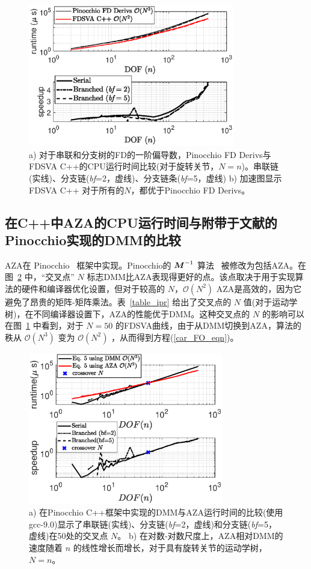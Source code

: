 \documentclass[letterpaper, 10 pt, conference]{ieeetran}  %
\begin{document}
\begin{figure}[tb]
\hspace*{-0.5cm}
\includegraphics[width=9cm]{fdcr_vs_fdsva_wo_march_gcc.eps}
\caption{a) 对于串联和分支树的FD的一阶偏导数，Pinocchio FD Derivs与FDSVA C++的CPU运行时间比较(对于旋转关节，$N=n$)。串联链(实线)、分支链(\textit{bf}=2，虚线)、分支链条(\textit{bf}=5，虚线) b) 加速图显示FDSVA C++ 对于所有的$N$，都优于Pinocchio FD Derivs。}
\label{fdsva_fdcr_pin}
\end{figure}

\subsection{在C++中AZA的CPU运行时间与附带于文献\cite{car}的Pinocchio实现的DMM的比较}
AZA在 Pinocchio~\cite{car_code} 框架中实现。Pinocchio的 $\boldsymbol{M}^{-1}$ 算法~\cite{InverseMassMatrix} 被修改为包括AZA。在图~\ref{dmm_vs_aza} 中，“交叉点” $N$ 标志DMM比AZA表现得更好的点。该点取决于用于实现算法的硬件和编译器优化设置，但对于较高的 $N$，$\mathcal{O}(N^2)$ AZA是高效的，因为它避免了昂贵的矩阵-矩阵乘法。表~\ref{table_ipr} 给出了交叉点的 $N$ 值(对于运动学树)，在不同编译器设置下，AZA的性能优于DMM。这种交叉点的 $N$ 的影响可以在图~\ref{fdsva_fdcr_pin} 中看到，对于 $N=50$ 的FDSVA曲线，由于从DMM切换到AZA，算法的秩从 $\mathcal{O}(N^3)$ 变为 $\mathcal{O}(N^2)$ ，从而得到方程(\ref{car_FO_eqn})。

\begin{figure}[tb]
\includegraphics[width=8.5cm]{DMM_vs_AZA_pinocchio.eps}
\caption{a) 在Pinocchio C++框架中实现的DMM与AZA运行时间的比较(使用gcc-9.0)显示了串联链(实线)、分支链(\textit{bf}=2，虚线)和分支链(\textit{bf}=5，虚线)在50处的交叉点 $N$。 b) 在对数-对数尺度上，AZA相对DMM的速度随着 $n$ 的线性增长而增长，对于具有旋转关节的运动学树，$N=n$。}
\label{dmm_vs_aza}
\end{figure}
\end{document}
